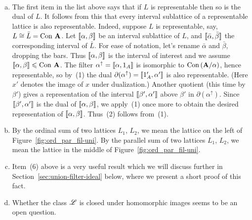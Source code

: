 \begin{remarks}\
  \begin{enumerate}[a.]
  \item 
  The first item in the list above says that if $L$ is representable then so is
  the dual of $L$. It follows from this that every interval sublattice of a
  representable lattice is also representable.  
  Indeed, suppose $L$ is representable, say, $L\cong \bar{L} =\operatorname{Con\,}\mathbf{A}$.
  Let $\llbracket \alpha, \beta \rrbracket$ be an interval sublattice of $L$,
  and $\llbracket \bar{\alpha}, \bar{\beta} \rrbracket$ the corresponding  
  interval of $\bar{L}$.
  For ease of notation, let's rename $\bar{\alpha}$ and $\bar{\beta}$, dropping
  the bars.  Thus $\llbracket \alpha, \beta \rrbracket$ is the interval of interest and we
  assume $\llbracket \alpha, \beta \rrbracket\leqslant \operatorname{Con\,} \mathbf{A}$.
  The filter $\alpha^\uparrow =\llbracket \alpha, 1_A \rrbracket$ 
  is isomorphic to $\operatorname{Con\,} (\mathbf{A}/\alpha)$, hence representable, so
  by~(1) the dual $\partial (\alpha^\uparrow)=\llbracket 1_A', \alpha'\rrbracket$ is also
  representable. (Here $x'$ denotes the image of $x$ under dualization.)
  Another quotient (this time by $\beta'$) gives a representation of
  the interval $\llbracket \beta', \alpha'\rrbracket$ above $\beta'$ in 
  $\partial (\alpha^\uparrow)$. 
  Since $\llbracket \beta', \alpha' \rrbracket$  is the dual of $\llbracket \alpha, \beta \rrbracket$, 
  we apply~(1) once more to obtain the desired representation of 
  $\llbracket \alpha, \beta\rrbracket$.  Thus~(2) follows from~(1).

  \item By the ordinal sum of two lattices $L_1$, $L_2$, we mean the lattice
  on the left of Figure~\ref{fig:ord_par_fil-uni}.
  By the parallel sum of two lattices $L_1$, $L_2$, we mean the lattice
  in the middle of Figure~\ref{fig:ord_par_fil-uni}.

\item Item~(6) above is a very useful result which we will discuss further in
  Section~\ref{sec:union-filter-ideal} below, where we present a short proof of
  this fact.

\item Whether the class $\mathscr{L}$ is closed under homomorphic images
  seems to be an open question. 
  \end{enumerate}
\end{remarks}

